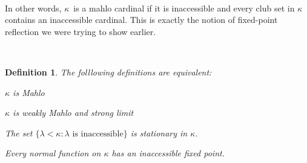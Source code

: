\documentclass[12pt,a4paper]{article}
\newtheorem{definition}[theorem]{Definition}
\newcommand{\bce}{\begin{compactenum}}
\newcommand{\ece}{\end{compactenum}}
\begin{document}
\begin{comment}
Analogously, 
\begin{definition}{$\alpha$-Mahlo Cardinal}\label{def:alpha_mahlo_cardinal}\\
$\kappa$ is a \emph{$\alpha$-Mahlo Cardinal} iff it is an $\alpha$-inaccessible cardinal and the set of all $\alpha$-inaccessible ordinals less then $\kappa$ is stationary in $\kappa$.
\end{definition}

\end{comment}

\

In other words, $\kappa$ is a mahlo cardinal if it is inaccessible and every club set in $\kappa$ contains an inaccessible cardinal. This is exactly the notion of fixed-point reflection we were trying to show earlier.

\

\cite{DrakeBook}
\begin{definition}{}\label{def:mahlo_equivalent}
The folllowing definitions are equivalent:
\bce[(i)]
\item $\kappa$ is Mahlo
\item $\kappa$ is weakly Mahlo and strong limit
\item The set $\{\lambda < \kappa : \lambda\mbox{ is inaccessible}\}$ is stationary in $\kappa$.
\item Every normal function on $\kappa$ has an inaccessible fixed point.
\ece
\end{definition}
\end{document}

